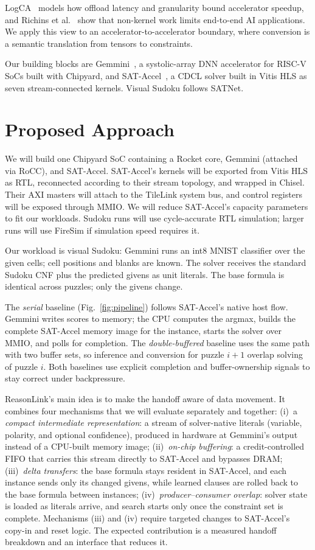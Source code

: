\documentclass[conference,10pt,letterpaper]{IEEEtran}
\begin{document}
LogCA~\cite{logca} models how offload latency and granularity bound accelerator speedup, and Richins et al.~\cite{richins2020forest} show that non-kernel work limits end-to-end AI applications. We apply this view to an accelerator-to-accelerator boundary, where conversion is a semantic translation from tensors to constraints.

Our building blocks are Gemmini~\cite{gemmini}, a systolic-array DNN accelerator for RISC-V SoCs built with Chipyard, and SAT-Accel~\cite{sataccel}, a CDCL solver built in Vitis HLS as seven stream-connected kernels. Visual Sudoku follows SATNet.

\section{Proposed Approach}
We will build one Chipyard SoC containing a Rocket core, Gemmini (attached via RoCC), and SAT-Accel. SAT-Accel's kernels will be exported from Vitis HLS as RTL, reconnected according to their stream topology, and wrapped in Chisel. Their AXI masters will attach to the TileLink system bus, and control registers will be exposed through MMIO. We will reduce SAT-Accel's capacity parameters to fit our workloads. Sudoku runs will use cycle-accurate RTL simulation; larger runs will use FireSim if simulation speed requires it.

Our workload is visual Sudoku: Gemmini runs an int8 MNIST classifier over the given cells; cell positions and blanks are known. The solver receives the standard Sudoku CNF plus the predicted givens as unit literals. The base formula is identical across puzzles; only the givens change.

The \emph{serial} baseline (Fig.~\ref{fig:pipeline}) follows SAT-Accel's native host flow. Gemmini writes scores to memory; the CPU computes the argmax, builds the complete SAT-Accel memory image for the instance, starts the solver over MMIO, and polls for completion. The \emph{double-buffered} baseline uses the same path with two buffer sets, so inference and conversion for puzzle $i{+}1$ overlap solving of puzzle $i$. Both baselines use explicit completion and buffer-ownership signals to stay correct under backpressure.

ReasonLink's main idea is to make the handoff aware of data movement. It combines four mechanisms that we will evaluate separately and together:
(i)~a \emph{compact intermediate representation}: a stream of solver-native literals (variable, polarity, and optional confidence), produced in hardware at Gemmini's output instead of a CPU-built memory image;
(ii)~\emph{on-chip buffering}: a credit-controlled FIFO that carries this stream directly to SAT-Accel and bypasses DRAM;
(iii)~\emph{delta transfers}: the base formula stays resident in SAT-Accel, and each instance sends only its changed givens, while learned clauses are rolled back to the base formula between instances;
(iv)~\emph{producer--consumer overlap}: solver state is loaded as literals arrive, and search starts only once the constraint set is complete.
Mechanisms (iii) and (iv) require targeted changes to SAT-Accel's copy-in and reset logic. The expected contribution is a measured handoff breakdown and an interface that reduces it.
\end{document}
